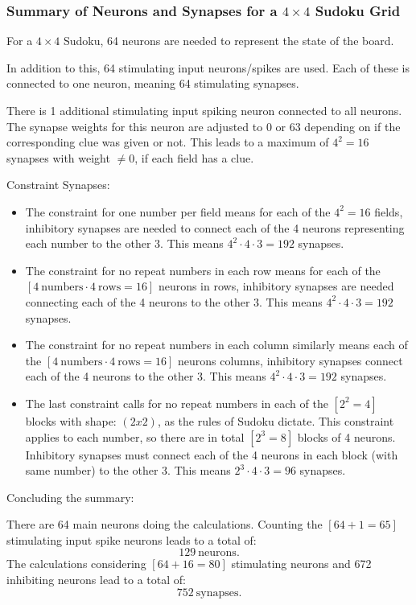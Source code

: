 
\subsubsection{Summary of Neurons and Synapses for a \( 4 \times 4 \) Sudoku Grid}

For a \( 4 \times 4 \) Sudoku, 64 neurons are needed to represent the state of the board.

In addition to this, 64 stimulating input neurons/spikes are used.
Each of these is connected to one neuron, meaning 64 stimulating synapses.

There is 1 additional stimulating input spiking neuron connected to all neurons.
The synapse weights for this neuron are adjusted to 0 or 63 depending on if the corresponding clue was given or not.
This leads to a maximum of \( 4^2 = 16 \)  synapses with weight \( ≠ 0 \), if each field has a clue.

Constraint Synapses:
\begin{itemize}
    \item The constraint for one number per field means for each of the \( 4^2 = 16 \) fields, inhibitory synapses are needed to connect each of the 4 neurons representing each number to the other 3.
    \subitem This means \( 4^2 \cdot 4 \cdot 3 = 192 \) synapses.

    \item The constraint for no repeat numbers in each row means for each of the \( [4 \ \text{numbers} \cdot 4 \ \text{rows} = 16] \) neurons in rows,
    inhibitory synapses are needed connecting each of the 4 neurons to the other 3.
    \subitem This means \( 4^2 \cdot 4 \cdot 3 = 192 \) synapses.

    \item The constraint for no repeat numbers in each column similarly means each of the \( [4 \ \text{numbers} \cdot 4 \ \text{rows} = 16] \) neurons columns,
    inhibitory synapses connect each of the 4 neurons to the other 3.
    \subitem This means \( 4^2 \cdot 4 \cdot 3 = 192 \) synapses.

    \item The last constraint calls for no repeat numbers in each of the \( [2^2 = 4] \) blocks with shape: \( (2 x 2) \), as the rules of Sudoku dictate.
    This constraint applies to each number, so there are in total \( [2^3 = 8] \) blocks of 4 neurons.
    Inhibitory synapses must connect each of the 4 neurons in each block (with same number) to the other 3.
    \subitem This means \( 2^3 \cdot 4 \cdot 3 = 96 \) synapses.
\end{itemize}

Concluding the summary:

There are 64 main neurons doing the calculations.
Counting the \( [64 + 1 = 65] \) stimulating input spike neurons leads to a total of:
\[129 \ \text{neurons.}\]
The calculations considering \( [64 + 16 = 80] \) stimulating neurons and 672 inhibiting neurons lead to a total of:
\[752 \ \text{synapses.}\]